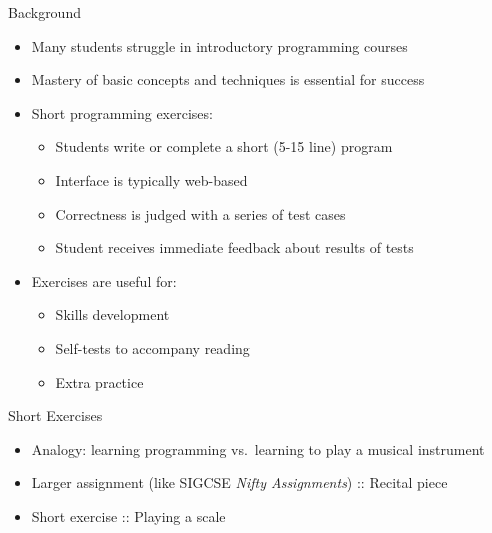 \documentclass{beamer}
\begin{document}
\begin{frame}{Background}

\begin{itemize}
  \item Many students struggle in introductory programming courses
  \item Mastery of basic concepts and techniques is essential for success
  \item Short programming exercises:
  \begin{itemize}
    \item Students write or complete a short (5-15 line) program
    \item Interface is typically web-based
    \item Correctness is judged with a series of test cases
    \item Student receives immediate feedback about results of tests
  \end{itemize}
  \item Exercises are useful for:
  \begin{itemize}
    \item Skills development
    \item Self-tests to accompany reading
    \item Extra practice
  \end{itemize}
\end{itemize}

\end{frame}


\begin{frame}{Short Exercises}

\begin{itemize}
  \item Analogy: learning programming vs.\ learning to play a musical instrument
  \item Larger assignment (like SIGCSE {\em Nifty Assignments}) :: Recital piece
  \item Short exercise :: Playing a scale
\end{itemize}

\end{frame}
\end{document}
